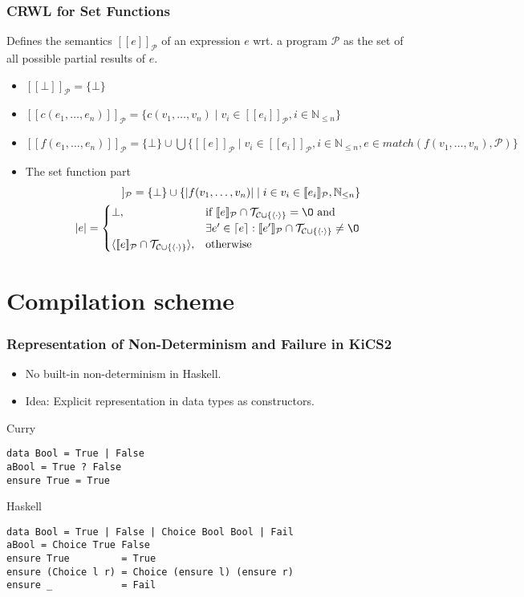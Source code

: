 \documentclass[utf8]{beamer}
\newcommand{\prog}{\mathcal{P}}
\newcommand{\cons}{\mathcal{C}}
\newcommand{\term}[1]{\mathcal{T}_{#1}}
\newcommand{\sem}[1]{[\![#1]\!]_\prog} %
\newcommand{\enc}[1]{|#1|} %
\newcommand{\encc}[1]{\langle #1 \rangle} %
\newcommand{\up}[1]{\lceil #1 \rceil} %
\newcommand{\nats}{\mathbb{N}} %
\begin{document}
\begin{frame}
\frametitle{CRWL for Set Functions}

Defines the semantics $\sem{e}$ of an expression $e$ wrt. a program $\prog$ as
the set of all possible partial results of $e$.

\begin{itemize}
\item<1-> $\sem{\bot} = \{\bot\}$
\item<1,3-> $\sem{c(e_1,\ldots, e_n)} = \{c(v_1,\ldots, v_n) \mid v_i \in \sem{e_i}, i \in \nats_{\le n}\}$
\item<1,4->  $\sem{f(e_1,\ldots,e_n)} =\{\bot\} \cup \bigcup\{\sem{e}\mid v_i \in \sem{e_i}, i \in \nats_{\le n}, e \in match(f(v_1,\ldots,v_n),\prog)\}$
\item<1,5-> The set function part 
\begin{align*} 
\sem{f_s(e_1,\ldots, e_n)} = \{\bot\}\cup \{\enc{f(v_1,\ldots, v_n)} \mid i \in  v_i \in \sem{e_i}, \nats_{\le n}\}\\
\enc{e} = \begin{cases}
             \bot, & \mbox{if } \sem{e} \cap \term{\cons \cup \{\encc{\cdot}\}} = \O \mbox{ and } \\
                   & \exists e' \in \up{e} : \sem{e'} \cap \term{\cons \cup \{\encc{\cdot}\}} \not = \O\\
             \encc{\sem{e} \cap \term{\cons \cup \{\encc{\cdot}\}}}, & \mbox{otherwise}
               \end{cases}
\end{align*}
\end{itemize}
\end{frame}

\section{Compilation scheme}

\begin{frame}[fragile]
\frametitle{Representation of Non-Determinism and Failure in KiCS2}
\begin{itemize}
  \item No built-in non-determinism in Haskell.
  \item Idea: Explicit representation in data types as constructors.
\end{itemize}
\pause
\begin{block}{Curry}
\begin{lstlisting}
data Bool = True | False
aBool = True ? False
ensure True = True
\end{lstlisting}
\end{block}

\begin{block}{Haskell}
\begin{lstlisting}
data Bool = True | False | Choice Bool Bool | Fail
aBool = Choice True False
ensure True         = True
ensure (Choice l r) = Choice (ensure l) (ensure r)
ensure _            = Fail
\end{lstlisting}
\end{block}
\end{frame}
\end{document}
